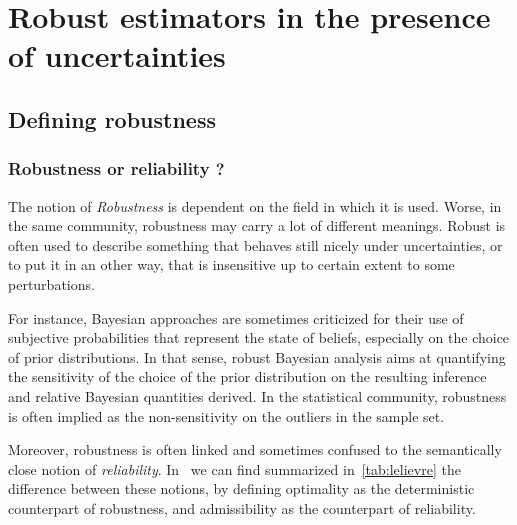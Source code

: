 \documentclass[../../Main_ManuscritThese.tex]{subfiles}
\begin{document}
\chapter{Robust estimators in the presence of uncertainties} 
\label{chap:robust_estimators}
\minitoc
\newpage
\subfileLocal{\pagestyle{contentStyle}}

\section{Defining robustness}
\subsection{Robustness or reliability ?}
The notion of \emph{Robustness} is dependent on the field in which it is used. Worse, in the same community, robustness may carry a lot of different meanings. Robust is often used to describe something that behaves still nicely under uncertainties, or to put it in an other way, that is insensitive up to certain extent to some perturbations.

For instance, Bayesian approaches are sometimes criticized for their use of subjective probabilities that represent the state of beliefs, especially on the choice of prior distributions. In that sense, robust Bayesian analysis aims at quantifying the sensitivity of the choice of the prior distribution on the resulting inference and relative Bayesian quantities derived. In the statistical community, robustness is often implied as the non-sensitivity on the outliers in the sample set.

Moreover, robustness is often linked and sometimes confused to the semantically close notion of \emph{reliability}. In~\cite{lelievre_consideration_2016} we can find summarized in~\cref{tab:lelievre} the difference between these notions,  by defining optimality as the deterministic counterpart of robustness, and admissibility as the counterpart of reliability.
\end{document}
